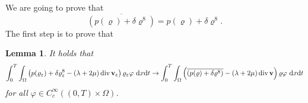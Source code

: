 \documentclass{article}
\DeclareMathOperator{\diver}{div}
\newcommand{\bv}{{\bf v}}
\newcommand{\vv}{\bv}
\newtheorem{lemma}[theorem]{Lemma}
\numberwithin{equation}{section}
\begin{document}
We are going to prove that 
\begin{equation}\label{eq.tlak}
\overline{(p(\varrho) + \delta\varrho^8)} = p(\varrho) + \delta\varrho^8.
\end{equation}
The first step is to prove that
\begin{lemma}
It holds that
\begin{equation}\label{eq.e.v.f}
\int_0^T\int_\Omega \left(p(\varrho_\varepsilon) + \delta\varrho_\varepsilon^8 - (\lambda + 2\mu)\diver\vv_\varepsilon\right)\varrho_\varepsilon \varphi\ {\rm d}x{\rm d}t \to \int_0^T\int_\Omega\left(\overline{(p(\varrho) + \delta\varrho^8)} - (\lambda + 2\mu)\diver \vv\right)\varrho \varphi\ {\rm d}x{\rm d}t
\end{equation}
for all $\varphi\in C^\infty_c((0,T)\times\Omega)$.
\end{lemma}
\end{document}
